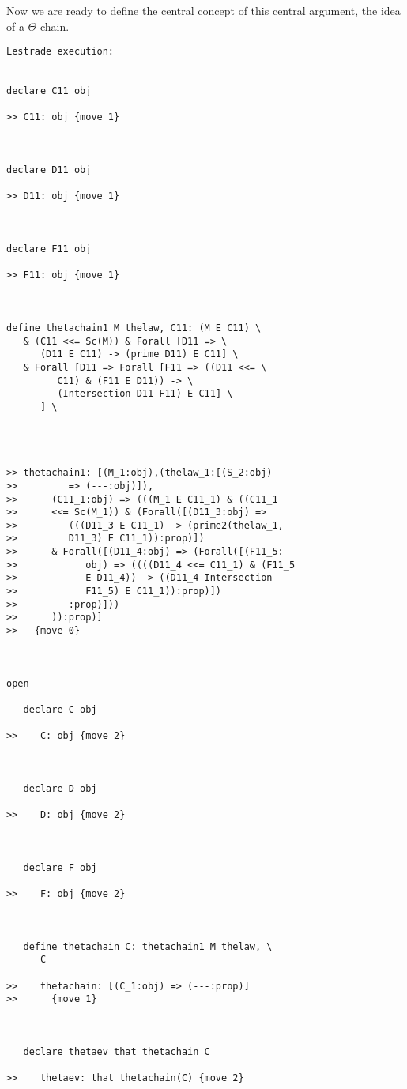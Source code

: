 \documentclass[12pt]{article}
\begin{document}
Now we are ready to define the central concept of this central argument, the idea of a $\Theta$-chain.

\begin{verbatim}Lestrade execution:


declare C11 obj

>> C11: obj {move 1}



declare D11 obj

>> D11: obj {move 1}



declare F11 obj

>> F11: obj {move 1}



define thetachain1 M thelaw, C11: (M E C11) \
   & (C11 <<= Sc(M)) & Forall [D11 => \
      (D11 E C11) -> (prime D11) E C11] \
   & Forall [D11 => Forall [F11 => ((D11 <<= \
         C11) & (F11 E D11)) -> \
         (Intersection D11 F11) E C11] \
      ] \
   



>> thetachain1: [(M_1:obj),(thelaw_1:[(S_2:obj)
>>         => (---:obj)]),
>>      (C11_1:obj) => (((M_1 E C11_1) & ((C11_1
>>      <<= Sc(M_1)) & (Forall([(D11_3:obj) =>
>>         (((D11_3 E C11_1) -> (prime2(thelaw_1,
>>         D11_3) E C11_1)):prop)])
>>      & Forall([(D11_4:obj) => (Forall([(F11_5:
>>            obj) => ((((D11_4 <<= C11_1) & (F11_5
>>            E D11_4)) -> ((D11_4 Intersection
>>            F11_5) E C11_1)):prop)])
>>         :prop)]))
>>      )):prop)]
>>   {move 0}



open

   declare C obj

>>    C: obj {move 2}



   declare D obj

>>    D: obj {move 2}



   declare F obj

>>    F: obj {move 2}



   define thetachain C: thetachain1 M thelaw, \
      C

>>    thetachain: [(C_1:obj) => (---:prop)]
>>      {move 1}



   declare thetaev that thetachain C

>>    thetaev: that thetachain(C) {move 2}




\end{verbatim}
\end{document}
